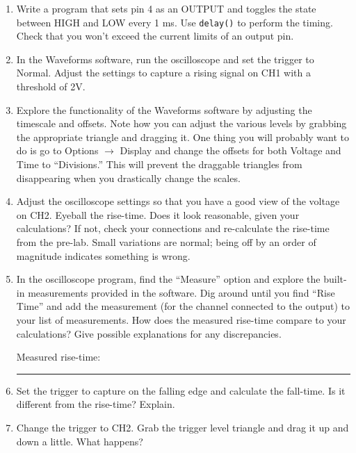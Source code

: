 \documentclass[11pt]{article} %
\begin{document}
\begin{enumerate}
\item Write a program that sets pin 4 as an OUTPUT and toggles the state between HIGH and LOW every 1 ms. Use \verb|delay()| to perform the timing. Check that you won’t exceed the current limits of an output pin.
\item In the Waveforms software, run the oscilloscope and set the trigger to Normal. Adjust the settings to capture a rising signal on CH1 with a threshold of 2V.
\item Explore the functionality of the Waveforms software by adjusting the timescale and offsets. Note how you can adjust the various levels by grabbing the appropriate triangle and dragging it. One thing you will probably want to do is go to Options $\rightarrow$ Display and change the offsets for both Voltage and Time to ``Divisions.'' This will prevent the draggable triangles from disappearing when you drastically change the scales.
\item Adjust the oscilloscope settings so that you have a good view of the voltage on CH2. Eyeball the rise-time. Does it look reasonable, given your calculations? If not, check your connections and re-calculate the rise-time from the pre-lab. Small variations are normal; being off by an order of magnitude indicates something is wrong.
\item In the oscilloscope program, find the ``Measure'' option and explore the built-in measurements provided in the software. Dig around until you find ``Rise Time'' and add the measurement (for the channel connected to the output) to your list of measurements. How does the measured rise-time compare to your calculations? Give possible explanations for any discrepancies.

\vspace{0.25in}
Measured rise-time: \rule{2in}{0.4pt}
\vspace{0.25in}

\item Set the trigger to capture on the falling edge and calculate the fall-time. Is it different from the rise-time? Explain.
\item Change the trigger to CH2. Grab the trigger level triangle and drag it up and down a little. What happens?
\end{enumerate}
\end{document}
